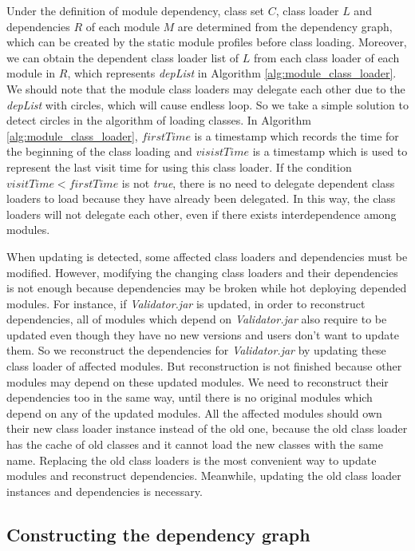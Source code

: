\documentclass[conference]{IEEEtran}
\begin{document}
Under the definition of module dependency, class set $C$, class loader $L$ and dependencies $R$ of each module $M$ are determined from the dependency graph, which can be created by the static module profiles before class loading.
Moreover, we can obtain the dependent class loader list of $L$ from each class loader of each module in $R$, which represents \emph{depList} in Algorithm \ref{alg:module_class_loader}. 
We should note that the module class loaders may delegate each other due to the \emph{depList} with circles, which will cause endless loop.
So we take a simple solution to detect circles in the algorithm of loading classes.
In Algorithm \ref{alg:module_class_loader}, $firstTime$ is a timestamp which records the time for the beginning of the class loading and $visistTime$ is a timestamp which is used to represent the last visit time for using this class loader. 
If the condition $visitTime < firstTime$ is not \emph{true}, there is no need to delegate dependent class loaders to load because they have already been delegated.
In this way, the class loaders will not delegate each other, even if there exists interdependence among modules.

When updating is detected, some affected class loaders and dependencies must be modified.
However, modifying the changing class loaders and their dependencies is not enough because dependencies may be broken while hot deploying depended modules.
For instance, if \emph{Validator.jar} is updated, in order to reconstruct dependencies, all of modules which depend on \emph{Validator.jar} also require to be updated even though they have no new versions and users don't want to update them.
So we reconstruct the dependencies for \emph{Validator.jar} by updating these class loader of affected modules.
But reconstruction is not finished because other modules may depend on these updated modules.
We need to reconstruct their dependencies too in the same way, until there is no original modules which depend on any of the updated modules.
All the affected modules should own their new class loader instance instead of the old one, because the old class loader has the cache of old classes and it cannot load the new classes with the same name.
Replacing the old class loaders is the most convenient way to update modules and reconstruct dependencies.
Meanwhile, updating the old class loader instances and dependencies is necessary.



\subsection{Constructing the dependency graph}
\end{document}
